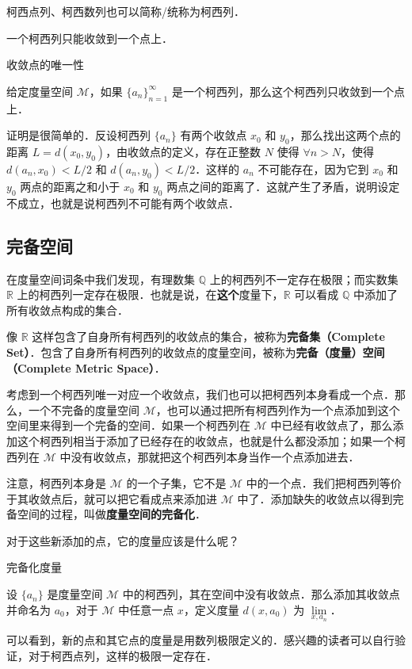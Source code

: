 柯西点列、柯西数列也可以简称/统称为柯西列．

一个柯西列只能收敛到一个点上．

\begin{theorem}{收敛点的唯一性}

给定度量空间 $\mathcal{M}$，如果 $\{a_n\}_{n=1}^{\infty}$ 是一个柯西列，那么这个柯西列只收敛到一个点上．

\end{theorem}

证明是很简单的．反设柯西列 $\{a_n\}$ 有两个收敛点 $x_0$ 和 $y_0$，那么找出这两个点的距离 $L=d(x_0, y_0)$，由收敛点的定义，存在正整数 $N$ 使得 $\forall n>N$，使得 $d(a_n, x_0)<L/2$ 和 $d(a_n, y_0)<L/2$．这样的 $a_n$ 不可能存在，因为它到 $x_0$ 和 $y_0$ 两点的距离之和小于 $x_0$ 和 $y_0$ 两点之间的距离了．这就产生了矛盾，说明设定不成立，也就是说柯西列不可能有两个收敛点．


\subsection{完备空间}

在度量空间词条中我们发现，有理数集 $\mathbb{Q}$ 上的柯西列不一定存在极限；而实数集 $\mathbb{R}$ 上的柯西列一定存在极限．也就是说，在\textbf{这个}度量下，$\mathbb{R}$ 可以看成 $\mathbb{Q}$ 中添加了所有收敛点构成的集合．

像 $\mathbb{R}$ 这样包含了自身所有柯西列的收敛点的集合，被称为\textbf{完备集（Complete Set）}．包含了自身所有柯西列的收敛点的度量空间，被称为\textbf{完备（度量）空间（Complete Metric Space）}．

考虑到一个柯西列唯一对应一个收敛点，我们也可以把柯西列本身看成一个点．那么，一个不完备的度量空间 $\mathcal{M}$，也可以通过把所有柯西列作为一个点添加到这个空间里来得到一个完备的空间．如果一个柯西列在 $\mathcal{M}$ 中已经有收敛点了，那么添加这个柯西列相当于添加了已经存在的收敛点，也就是什么都没添加；如果一个柯西列在 $\mathcal{M}$ 中没有收敛点，那就把这个柯西列本身当作一个点添加进去．

注意，柯西列本身是 $\mathcal{M}$ 的一个子集，它不是 $\mathcal{M}$ 中的一个点．我们把柯西列等价于其收敛点后，就可以把它看成点来添加进 $\mathcal{M}$ 中了．添加缺失的收敛点以得到完备空间的过程，叫做\textbf{度量空间的完备化}．

对于这些新添加的点，它的度量应该是什么呢？

\begin{definition}{完备化度量}

设 $\{a_n\}$ 是度量空间 $\mathcal{M}$ 中的柯西列，其在空间中没有收敛点．那么添加其收敛点并命名为 $a_0$，对于 $\mathcal{M}$ 中任意一点 $x$，定义度量 $d(x, a_0)$ 为 $\lim\limits_{x, a_n}$．

\end{definition}

可以看到，新的点和其它点的度量是用数列极限定义的．感兴趣的读者可以自行验证，对于柯西点列，这样的极限一定存在．